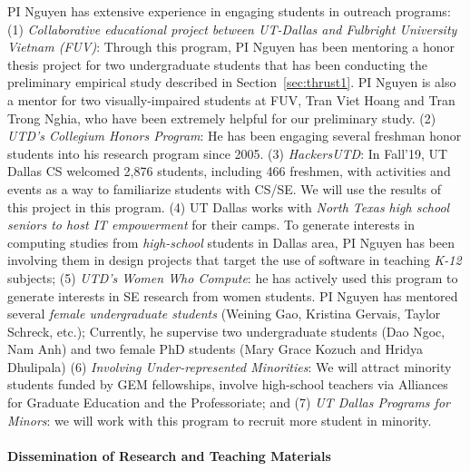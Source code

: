 PI Nguyen has extensive experience in engaging students in outreach
programs: (1) {\em Collaborative educational project between UT-Dallas
and Fulbright University Vietnam (FUV)}: Through this program, PI
Nguyen has been mentoring a honor thesis project for two undergraduate
students that has been conducting the preliminary empirical study
described in Section~\ref{sec:thrust1}. PI Nguyen is also a mentor for
two visually-impaired students at FUV, Tran Viet Hoang and Tran Trong
Nghia, who have been extremely helpful for our preliminary study.
(2) {\em UTD's Collegium Honors Program}: He
has been engaging several freshman honor students into his research
program since 2005. (3) {\em HackersUTD}: In Fall'19, UT Dallas CS
welcomed 2,876 students, including 466 freshmen, with activities and
events as a way to familiarize students with CS/SE. We will use the
results of this project in this program.
%
(4) UT Dallas works with {\em North Texas high school seniors to host
IT empowerment} for their camps. To generate interests in computing
studies from {\em high-school} students in Dallas area, PI Nguyen has
been involving them in design projects that target the use of software
in teaching {\em K-12} subjects; (5) {\em UTD's Women Who Compute}: he
has actively used this program to generate interests in SE research
from women students. PI Nguyen has mentored several {\em female
undergraduate students} (Weining Gao, Kristina Gervais, Taylor
Schreck, etc.); Currently, he supervise two undergraduate students
(Dao Ngoc, Nam Anh) and two female PhD students (Mary Grace Kozuch and
Hridya Dhulipala) (6) {\em Involving Under-represented Minorities}: We
will attract minority students funded by GEM fellowships, involve
high-school teachers via Alliances for Graduate Education and the
Professoriate; and (7) {\em UT Dallas Programs for Minors}: we will
work with this program to recruit more student in minority.


\paragraph{Dissemination of Research and Teaching Materials}

